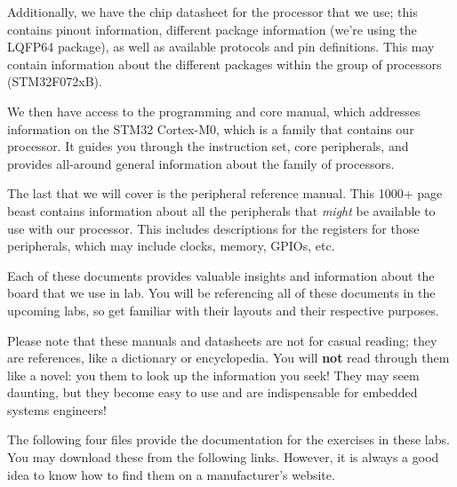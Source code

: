 \documentclass[openany,11pt,fleqn]{book} %
\begin{document}
Additionally, we have the chip datasheet for the processor that we use; this contains pinout information, different package information (we're using the LQFP64 package), as well as available protocols and pin definitions. This may contain information about the different packages within the group of processors (STM32F072xB).

We then have access to the programming and core manual, which addresses information on the STM32 Cortex-M0, which is a family that contains our processor. It guides you through the instruction set, core peripherals, and provides all-around general information about the family of processors.

The last that we will cover is the peripheral reference manual. This 1000+ page beast contains information about all the peripherals that \textit{might} be available to use with our processor. This includes descriptions for the registers for those peripherals, which may include clocks, memory, GPIOs, etc.

Each of these documents provides valuable insights and information about the board that we use in lab. You will be referencing all of these documents in the upcoming labs, so get familiar with their layouts and their respective purposes.

\begin{warning}
	Please note that these manuals and datasheets are not for casual reading; they are references, like a dictionary or encyclopedia. You will \textbf{not} read through them like a novel: you them to look up the information you seek! They may seem daunting, but they become easy to use and are indispensable for embedded systems engineers!
\end{warning}

The following four files provide the documentation for the exercises in these labs. You may download these from the following links. However, it is always a good idea to know how to find them on a manufacturer's website.
\end{document}
